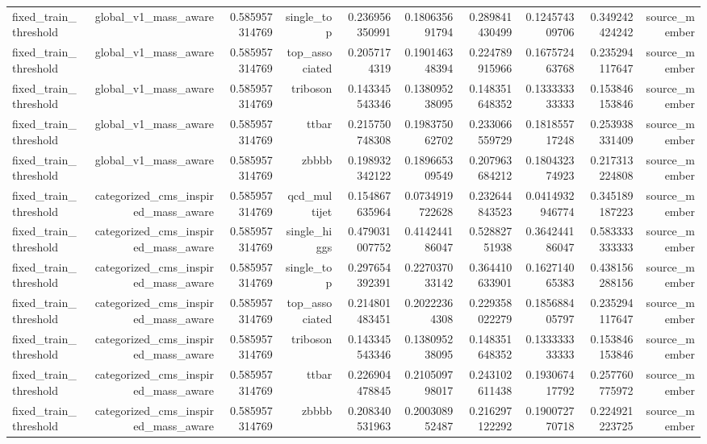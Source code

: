 \begin{table}[htbp]
{\begin{tabular}{lrrrrrrrrr}
fixed\_train\_threshold & global\_v1\_mass\_aware & 0.585957314769 & single\_top & 0.236956350991 & 0.180635691794 & 0.289841430499 & 0.124574309706 & 0.349242424242 & source\_member \\
fixed\_train\_threshold & global\_v1\_mass\_aware & 0.585957314769 & top\_associated & 0.2057174319 & 0.190146348394 & 0.224789915966 & 0.167572463768 & 0.235294117647 & source\_member \\
fixed\_train\_threshold & global\_v1\_mass\_aware & 0.585957314769 & triboson & 0.143345543346 & 0.138095238095 & 0.148351648352 & 0.133333333333 & 0.153846153846 & source\_member \\
fixed\_train\_threshold & global\_v1\_mass\_aware & 0.585957314769 & ttbar & 0.215750748308 & 0.198375062702 & 0.233066559729 & 0.181855717248 & 0.253938331409 & source\_member \\
fixed\_train\_threshold & global\_v1\_mass\_aware & 0.585957314769 & zbbbb & 0.198932342122 & 0.189665309549 & 0.207963684212 & 0.180432374923 & 0.217313224808 & source\_member \\
fixed\_train\_threshold & categorized\_cms\_inspired\_mass\_aware & 0.585957314769 & qcd\_multijet & 0.154867635964 & 0.0734919722628 & 0.232644843523 & 0.0414932946774 & 0.345189187223 & source\_member \\
fixed\_train\_threshold & categorized\_cms\_inspired\_mass\_aware & 0.585957314769 & single\_higgs & 0.479031007752 & 0.414244186047 & 0.52882751938 & 0.364244186047 & 0.583333333333 & source\_member \\
fixed\_train\_threshold & categorized\_cms\_inspired\_mass\_aware & 0.585957314769 & single\_top & 0.297654392391 & 0.227037033142 & 0.364410633901 & 0.162714065383 & 0.438156288156 & source\_member \\
fixed\_train\_threshold & categorized\_cms\_inspired\_mass\_aware & 0.585957314769 & top\_associated & 0.214801483451 & 0.20222364308 & 0.229358022279 & 0.185688405797 & 0.235294117647 & source\_member \\
fixed\_train\_threshold & categorized\_cms\_inspired\_mass\_aware & 0.585957314769 & triboson & 0.143345543346 & 0.138095238095 & 0.148351648352 & 0.133333333333 & 0.153846153846 & source\_member \\
fixed\_train\_threshold & categorized\_cms\_inspired\_mass\_aware & 0.585957314769 & ttbar & 0.226904478845 & 0.210509798017 & 0.243102611438 & 0.193067417792 & 0.257760775972 & source\_member \\
fixed\_train\_threshold & categorized\_cms\_inspired\_mass\_aware & 0.585957314769 & zbbbb & 0.208340531963 & 0.200308952487 & 0.216297122292 & 0.190072770718 & 0.224921223725 & source\_member \\

\end{tabular}}
\end{table}
